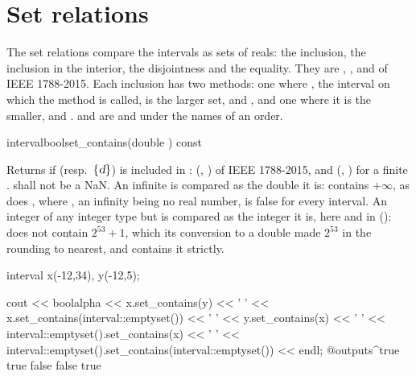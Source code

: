 \section{Set relations}\label{sec:relations-set}

The set relations compare the intervals as sets of reals: the inclusion, the
inclusion in the interior, the disjointness and the equality. They are
, ,  and  of
IEEE 1788-2015. Each inclusion has two methods: one where , the
interval on which the method is called, is the larger set,
 and , and one where it
is the smaller,  and .  and
 are  and
 under the names of an order.

\begin{defmethod}{interval}{bool}{set\_contains}{(double ) const}
  \begin{operation}
  \end{operation}
  Returns  if  (resp.\ $\{\textsl{d}\}$) is included in
  : (, ) of IEEE 1788-2015, and
  (, ) for a finite .  shall
  not be a NaN. An infinite  is compared as the double it is:
   contains $+\infty$, as does \itv{-\infty}{+\infty}, where
  , an infinity being no real number, is false for every
  interval. An integer of any integer type but  is compared as
  the integer it is, here and in 
  ():  does not contain $2^{53}+1$,
  which its conversion to a double made $2^{53}$ in the rounding to nearest,
  and  contains it strictly.\newinvfive

\begin{example}
interval x(-12,34), y(-12,5);

cout << boolalpha << x.set_contains(y) << ' '
     << x.set_contains(interval::emptyset()) << ' '
     << y.set_contains(x) << ' '
     << interval::emptyset().set_contains(x) << ' '
     << interval::emptyset().set_contains(interval::emptyset())
     << endl;
@outputs^true true false false true~
\end{example}
\end{defmethod}

